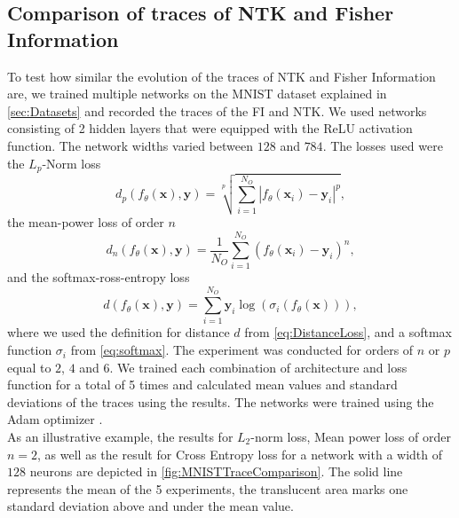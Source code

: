 \subsection{Comparison of traces of NTK and Fisher Information}\label{sec:TraceComparisonExperiment}
To test how similar the evolution of the traces of NTK and Fisher Information are, we trained multiple networks on the MNIST dataset explained in \cref{sec:Datasets} and recorded the traces of the FI and NTK. We used networks consisting of 2 hidden layers that were equipped with the ReLU activation function. The network widths varied between $128$ and $784$. The losses used were the $L_p$-Norm loss \cite{LpNormSource}
\begin{equation}
	d_p(f_\theta(\mathbf{x}),\mathbf{y}) = \sqrt[p]{\sum_{i=1}^{N_O} |f_\theta(\mathbf{x}_i) - \mathbf{y}_i|^p},
\end{equation}
the mean-power loss of order $n$
\begin{equation}
	d_n(f_\theta(\mathbf{x}),\mathbf{y}) = \frac{1}{N_O} \sum_{i=1}^{N_O} (f_\theta(\mathbf{x}_i)-\mathbf{y}_i)^n,
\end{equation}
and the softmax-ross-entropy loss \cite{LossExamplePaper}
\begin{equation}
	d(f_\theta(\mathbf{x}),\mathbf{y}) = \sum_{i=1}^{N_O} \mathbf{y}_i \log(\sigma_i(f_\theta(\mathbf{x}))),
\end{equation}
where we used the definition for distance $d$ from \cref{eq:DistanceLoss}, and a softmax function $\sigma_i$ from \cref{eq:softmax}. The experiment was conducted for orders of $n$ or $p$ equal to $2$, $4$ and $6$. We trained each combination of architecture and loss function for a total of 5 times and calculated mean values and standard deviations of the traces using the results. The networks were trained using the Adam optimizer \cite{adamPaper}.\\
As an illustrative example, the results for $L_2$-norm loss, Mean power loss of order $n=2$, as well as the result for Cross Entropy loss for a network with a width of $128$ neurons are depicted in \cref{fig:MNISTTraceComparison}. The solid line represents the mean of the 5 experiments, the translucent area marks one standard deviation above and under the mean value.\\
